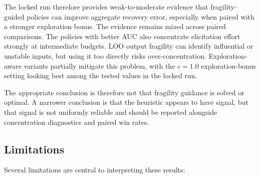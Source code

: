 \documentclass[11pt]{article}
\begin{document}
The locked run therefore provides weak-to-moderate evidence that fragility-guided policies can improve aggregate recovery error, especially when paired with a stronger exploration bonus. The evidence remains mixed across paired comparisons. The policies with better AUC also concentrate elicitation effort strongly at intermediate budgets. LOO output fragility can identify influential or unstable inputs, but using it too directly risks over-concentration. Exploration-aware variants partially mitigate this problem, with the \(c=1.0\) exploration-bonus setting looking best among the tested values in the locked run.

The appropriate conclusion is therefore not that fragility guidance is solved or optimal. A narrower conclusion is that the heuristic appears to have signal, but that signal is not uniformly reliable and should be reported alongside concentration diagnostics and paired win rates.

\subsection{Limitations}

Several limitations are central to interpreting these results:
\end{document}
